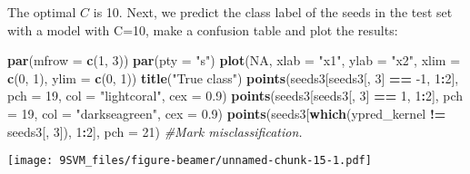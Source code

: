 \documentclass[10pt,ignorenonframetext,]{beamer}
\newenvironment{Shaded}{\begin{snugshade}}{\end{snugshade}}
\newcommand{\KeywordTok}[1]{\textcolor[rgb]{0.13,0.29,0.53}{\textbf{#1}}}
\newcommand{\DataTypeTok}[1]{\textcolor[rgb]{0.13,0.29,0.53}{#1}}
\newcommand{\DecValTok}[1]{\textcolor[rgb]{0.00,0.00,0.81}{#1}}
\newcommand{\FloatTok}[1]{\textcolor[rgb]{0.00,0.00,0.81}{#1}}
\newcommand{\StringTok}[1]{\textcolor[rgb]{0.31,0.60,0.02}{#1}}
\newcommand{\CommentTok}[1]{\textcolor[rgb]{0.56,0.35,0.01}{\textit{#1}}}
\newcommand{\OtherTok}[1]{\textcolor[rgb]{0.56,0.35,0.01}{#1}}
\newcommand{\OperatorTok}[1]{\textcolor[rgb]{0.81,0.36,0.00}{\textbf{#1}}}
\newcommand{\NormalTok}[1]{#1}
\begin{document}
\begin{frame}[fragile]

The optimal \(C\) is 10. Next, we predict the class label of the seeds
in the test set with a model with C=10, make a confusion table and plot
the results:

\begin{Shaded}
\end{Shaded}

\end{frame}

\begin{frame}[fragile]

\begin{Shaded}
\begin{Highlighting}[]
\KeywordTok{par}\NormalTok{(}\DataTypeTok{mfrow =} \KeywordTok{c}\NormalTok{(}\DecValTok{1}\NormalTok{, }\DecValTok{3}\NormalTok{))}
\KeywordTok{par}\NormalTok{(}\DataTypeTok{pty =} \StringTok{"s"}\NormalTok{)}
\KeywordTok{plot}\NormalTok{(}\OtherTok{NA}\NormalTok{, }\DataTypeTok{xlab =} \StringTok{"x1"}\NormalTok{, }\DataTypeTok{ylab =} \StringTok{"x2"}\NormalTok{, }\DataTypeTok{xlim =} \KeywordTok{c}\NormalTok{(}\DecValTok{0}\NormalTok{, }\DecValTok{1}\NormalTok{), }\DataTypeTok{ylim =} \KeywordTok{c}\NormalTok{(}\DecValTok{0}\NormalTok{, }\DecValTok{1}\NormalTok{))}
\KeywordTok{title}\NormalTok{(}\StringTok{"True class"}\NormalTok{)}
\KeywordTok{points}\NormalTok{(seeds3[seeds3[, }\DecValTok{3}\NormalTok{] }\OperatorTok{==}\StringTok{ }\DecValTok{-1}\NormalTok{, }\DecValTok{1}\OperatorTok{:}\DecValTok{2}\NormalTok{], }\DataTypeTok{pch =} \DecValTok{19}\NormalTok{, }\DataTypeTok{col =} \StringTok{"lightcoral"}\NormalTok{, }
    \DataTypeTok{cex =} \FloatTok{0.9}\NormalTok{)}
\KeywordTok{points}\NormalTok{(seeds3[seeds3[, }\DecValTok{3}\NormalTok{] }\OperatorTok{==}\StringTok{ }\DecValTok{1}\NormalTok{, }\DecValTok{1}\OperatorTok{:}\DecValTok{2}\NormalTok{], }\DataTypeTok{pch =} \DecValTok{19}\NormalTok{, }\DataTypeTok{col =} \StringTok{"darkseagreen"}\NormalTok{, }
    \DataTypeTok{cex =} \FloatTok{0.9}\NormalTok{)}
\KeywordTok{points}\NormalTok{(seeds3[}\KeywordTok{which}\NormalTok{(ypred_kernel }\OperatorTok{!=}\StringTok{ }\NormalTok{seeds3[, }\DecValTok{3}\NormalTok{]), }\DecValTok{1}\OperatorTok{:}\DecValTok{2}\NormalTok{], }\DataTypeTok{pch =} \DecValTok{21}\NormalTok{)  }\CommentTok{#Mark misclassification.}
\end{Highlighting}
\end{Shaded}

\texttt{[image: 9SVM\_files/figure-beamer/unnamed-chunk-15-1.pdf]}

\end{frame}
\end{document}
